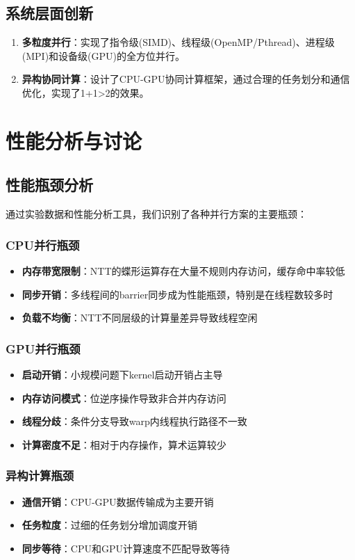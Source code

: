 \documentclass[a4paper]{article}
\begin{document}
	\subsection{系统层面创新}
	\begin{enumerate}
		\item \textbf{多粒度并行}：实现了指令级(SIMD)、线程级(OpenMP/Pthread)、进程级(MPI)和设备级(GPU)的全方位并行。
		\item \textbf{异构协同计算}：设计了CPU-GPU协同计算框架，通过合理的任务划分和通信优化，实现了1+1>2的效果。
	\end{enumerate}
	
	\section{性能分析与讨论}
	\subsection{性能瓶颈分析}
	通过实验数据和性能分析工具，我们识别了各种并行方案的主要瓶颈：
	\subsubsection{CPU并行瓶颈}
	\begin{itemize}
		\item \textbf{内存带宽限制}：NTT的蝶形运算存在大量不规则内存访问，缓存命中率较低
		\item \textbf{同步开销}：多线程间的barrier同步成为性能瓶颈，特别是在线程数较多时
		\item \textbf{负载不均衡}：NTT不同层级的计算量差异导致线程空闲
	\end{itemize}
	\subsubsection{GPU并行瓶颈}
	\begin{itemize}
		\item \textbf{启动开销}：小规模问题下kernel启动开销占主导
		\item \textbf{内存访问模式}：位逆序操作导致非合并内存访问
		\item \textbf{线程分歧}：条件分支导致warp内线程执行路径不一致
		\item \textbf{计算密度不足}：相对于内存操作，算术运算较少
	\end{itemize}
	\subsubsection{异构计算瓶颈}
	\begin{itemize}
		\item \textbf{通信开销}：CPU-GPU数据传输成为主要开销
		\item \textbf{任务粒度}：过细的任务划分增加调度开销
		\item \textbf{同步等待}：CPU和GPU计算速度不匹配导致等待
	\end{itemize}
\end{document}
